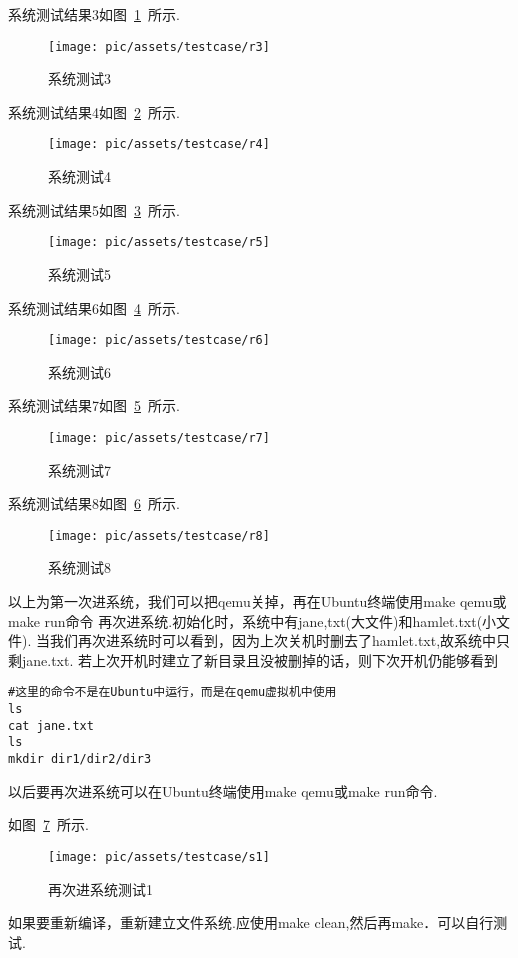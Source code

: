 系统测试结果3如图~\ref{r3}~所示.

\begin{figure}[!htbp]
    \centering	\texttt{[image: pic/assets/testcase/r3]}
    \caption{系统测试3}	\label{r3}	\end{figure}

系统测试结果4如图~\ref{r4}~所示.

\begin{figure}[!htbp]
    \centering	\texttt{[image: pic/assets/testcase/r4]}
    \caption{系统测试4}	\label{r4}	\end{figure}

系统测试结果5如图~\ref{r5}~所示.

\begin{figure}[!htbp]
    \centering	\texttt{[image: pic/assets/testcase/r5]}
    \caption{系统测试5}	\label{r5}	\end{figure} 

系统测试结果6如图~\ref{r6}~所示.

\begin{figure}[!htbp]
    \centering	\texttt{[image: pic/assets/testcase/r6]}
    \caption{系统测试6}	\label{r6}	\end{figure} 

系统测试结果7如图~\ref{r7}~所示.

\begin{figure}[!htbp]
    \centering	\texttt{[image: pic/assets/testcase/r7]}
    \caption{系统测试7}	\label{r7}	\end{figure} 

系统测试结果8如图~\ref{r8}~所示.

\begin{figure}[!htbp]
    \centering	\texttt{[image: pic/assets/testcase/r8]}
    \caption{系统测试8}	\label{r8}	\end{figure}    

以上为第一次进系统，我们可以把qemu关掉，再在Ubuntu终端使用make qemu或make run命令
再次进系统.初始化时，系统中有jane,txt(大文件)和hamlet.txt(小文件).
当我们再次进系统时可以看到，因为上次关机时删去了hamlet.txt,故系统中只剩jane.txt.
若上次开机时建立了新目录且没被删掉的话，则下次开机仍能够看到
\begin{verbatim}
#这里的命令不是在Ubuntu中运行，而是在qemu虚拟机中使用
ls
cat jane.txt
ls
mkdir dir1/dir2/dir3
\end{verbatim}

以后要再次进系统可以在Ubuntu终端使用make qemu或make run命令.

如图~\ref{s1}~所示.

\begin{figure}[!htbp]
    \centering	\texttt{[image: pic/assets/testcase/s1]}
    \caption{再次进系统测试1}	\label{s1}	\end{figure}  

如果要重新编译，重新建立文件系统.应使用make clean,然后再make．可以自行测试.
    



